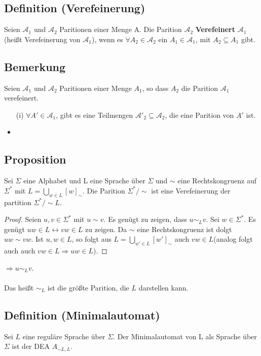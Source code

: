\subsection{Definition (Verefeinerung)} Seien $\mathcal{A}_1$ und $\mathcal{A}_2$ Paritionen einer Menge A. Die Parition $\mathcal{A}_2$ \textbf{Verefeinert} $\mathcal{A}_1$ (heißt Verefeinerung von $\mathcal{A}_1$), wenn es $\forall A_2 \in \mathcal{A}_2$ ein $A_1 \in \mathcal{A}_1$, mit $A_2 \subseteq A_1$ gibt.

\subsection{Bemerkung} Seien $\mathcal{A}_1$ und $\mathcal{A}_2$ Paritionen einer Menge $A_1$, so dass $A_2$ die Parition $\mathcal{A}_1$ verefeinert.
\begin{itemize}
  \item [(i)] $\forall A' \in \mathcal{A}_1$, gibt es eine Teilmengen $\mathcal{A}'_2 \subseteq \mathcal{A}_2$, die eine Parition von $A'$ ist.
  \item 
\end{itemize}

\subsection{Proposition} Sei $\Sigma$ eine Alphabet und L eine Sprache über $\Sigma$ und $\sim$ eine Rechtskongruenz auf $\Sigma^*$ mit $L = \bigcup \limits_{w \in L} [w]_{\sim}$. Die Parition $\Sigma^*/\sim$ ist eine Verefeinerung der partition $\Sigma^*/ \sim L$.

\begin{proof}
  Seien $u, v \in \Sigma^*$ mit $u \sim v$. Es genügt zu zeigen, dass $u \sim_{L} v$. Sei $w \in \Sigma^*$. Es genügt $uw \in L \leftrightarrow vw \in L$ zu zeigen. Da $\sim$ eine Rechtskongruenz ist dolgt $uw \sim vw$. Ist $u, w \in L$, so folgt aus $L = \bigcup \limits_{w' \in L} [w']_\sim$ auch $vw \in L$(analog folgt auch auch $vw \in L \Rightarrow uw \in L$).
\end{proof}

$\Rightarrow u \sim_L v$.\\\\

Das heißt $\sim_L$ ist die größte Parition, die $L$ darstellen kann.

\subsection{Definition (Minimalautomat)} Sei $L$ eine reguläre Sprache über $\Sigma$. Der Minimalautomat von L als Sprache über $\Sigma$ ist der DEA $A_{\sim L, L}$.

